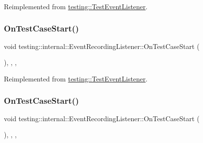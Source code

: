 Reimplemented from \mbox{\hyperlink{classtesting_1_1_test_event_listener_ac48628c9f78d3e10bff77c7366e9e780}{testing\+::\+Test\+Event\+Listener}}.

\mbox{\label{classtesting_1_1internal_1_1_event_recording_listener_a3ce90fda790857eb64444038a5b3258f}} 
\subsubsection{\texorpdfstring{OnTestCaseStart()}{OnTestCaseStart()}\hspace{0.1cm}{\footnotesize\ttfamily [2/3]}}
{\footnotesize\ttfamily void testing\+::internal\+::\+Event\+Recording\+Listener\+::\+On\+Test\+Case\+Start (\begin{DoxyParamCaption}\item[{const \mbox{\hyperlink{classtesting_1_1_test_case}{Test\+Case}} \&}]{ }\end{DoxyParamCaption})\hspace{0.3cm}{\ttfamily [inline]}, {\ttfamily [override]}, {\ttfamily [protected]}, {\ttfamily [virtual]}}



Reimplemented from \mbox{\hyperlink{classtesting_1_1_test_event_listener_ac48628c9f78d3e10bff77c7366e9e780}{testing\+::\+Test\+Event\+Listener}}.

\mbox{\label{classtesting_1_1internal_1_1_event_recording_listener_a3ce90fda790857eb64444038a5b3258f}} 
\subsubsection{\texorpdfstring{OnTestCaseStart()}{OnTestCaseStart()}\hspace{0.1cm}{\footnotesize\ttfamily [3/3]}}
{\footnotesize\ttfamily void testing\+::internal\+::\+Event\+Recording\+Listener\+::\+On\+Test\+Case\+Start (\begin{DoxyParamCaption}\item[{const \mbox{\hyperlink{classtesting_1_1_test_case}{Test\+Case}} \&}]{ }\end{DoxyParamCaption})\hspace{0.3cm}{\ttfamily [inline]}, {\ttfamily [override]}, {\ttfamily [protected]}, {\ttfamily [virtual]}}



